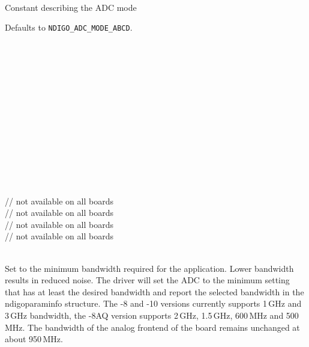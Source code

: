             \\
            Constant describing the ADC mode\par

            Defaults to \texttt{NDIGO\_ADC\_MODE\_ABCD}.\par

            \\
            \\
            \\
            \\
            \\
            \\
            \\
            \\
            \\
            \\
            \\
            \\
            \\
             // not available on all boards\\
             // not available on all boards\\
             // not available on all boards\\
             // not available on all boards\par

            \\
            Set to the minimum bandwidth required for the application. Lower bandwidth results in reduced noise. The driver will set the ADC to the minimum setting that has at least the desired bandwidth and report the selected bandwidth in the \textsf{ndigo\tu param\tu info} structure. The -8 and -10 versions currently supports 1\,GHz and 3\,GHz bandwidth, the -8AQ version supports 2\,GHz, 1.5\,GHz, 600\,MHz and 500\,MHz. The bandwidth of the analog frontend of the board remains unchanged at about 950\,MHz.
            \par

